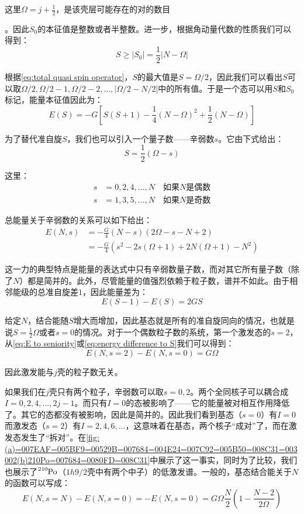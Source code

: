 这里$\Omega=j+\frac{1}{2}$，是该壳层可能存在的对的数目

。因此$S_{0}$的本征值是整数或者半整数。进一步，根据角动量代数的性质我们可以得到：
\[
S\geq\left|S_{0}\right|=\frac{1}{2}\left|N-\Omega\right|
\]

根据\ref{eq:total quasi spin operator}，$S$的最大值是$S=\Omega/2$，因此我们可以看出$S$可以取$\Omega/2,\Omega/2-1,\Omega/2-2,\dots,\left|\Omega/2-N/2\right|$中的所有值。于是一个态可以用$S$和$S_{0}$标记，能量本征值因此为：
\[
E(S)=-G[S(S+1)-\frac{1}{4}(N-\Omega)^{2}+\frac{1}{2}(N-\Omega)]
\]

为了替代准自旋$S$，我们也可以引入一个量子数——辛弱数$s$\cite{Ra43}。它由下式给出：
\[
S=\frac{1}{2}(\Omega-s)
\]

这里：
\begin{align*}
s & =0,2,4,\dots,N\quad\text{如果}N\text{是偶数}\\
s & =1,3,5,\dots,N\quad\text{如果}N\text{是奇数}
\end{align*}

总能量关于辛弱数的关系可以如下给出：
\begin{align}
E(N,s) & =-\frac{G}{4}(N-s)(2\Omega-s-N+2)\nonumber \\
 & =-\frac{G}{4}(s^{2}-2s(\Omega+1)+2N(\Omega+1)-N^{2})\label{eq:E to seniority}
\end{align}

这一力的典型特点是能量的表达式中只有辛弱数量子数，而对其它所有量子数（除了$N$）都是简并的。此外，尽管能量的值强烈依赖于粒子数，谱并不如此。由于相邻能级的总准自旋差$1$，因此能量差为：
\begin{equation}
E(S-1)-E(S)=2GS\label{eq:energy difference to S}
\end{equation}

给定$N$，结合能随$S$增大而增加，因此基态就是所有的准自旋同向的情况，也就是说$S=\frac{1}{2}\Omega$或者$s=0$的情况。对于一个偶数粒子数的系统，第一个激发态的$s=2$，从\ref{eq:E to seniority}或\ref{eq:energy difference to S}我们可以得到：
\begin{equation}
E(N,s=2)-E(N,s=0)=G\Omega\label{eq:energy gap}
\end{equation}

因此激发能与$j$壳的粒子数无关。

如果我们在$j$壳只有两个粒子，辛弱数可以取$s=0,2$。两个全同核子可以耦合成$I=0,2,4,\dots,2j-1$。而只有$I=0$的态被影响了——它的能量被对相互作用降低了。其它的态都没有被影响，因此是简并的。因此我们看到基态（$s=0$）有$I=0$而激发态（$s=2$）有$I=2,4,6,\dots$，这意味着在基态，两个核子“成对”了，而在激发态发生了“拆对”。在\ref{fig:(a)=007EAF=005BF9=00529B=007684=004E24=007C92=005B50=008C31=003002(b)210Po=007684=0080FD=008C31}中展示了这一事实，同时为了比较，我们也展示了$\ce{^{210}Po}$（$1h9/2$壳中有两个中子）的低激发谱。一般的，基态结合能关于$N$的函数可以写成：
\begin{equation}
E(N,s=N)-E(N,s=0)=-E(N,s=0)=G\Omega\frac{N}{2}\left(1-\frac{N-2}{2\Omega}\right)\label{eq:E to N}
\end{equation}

